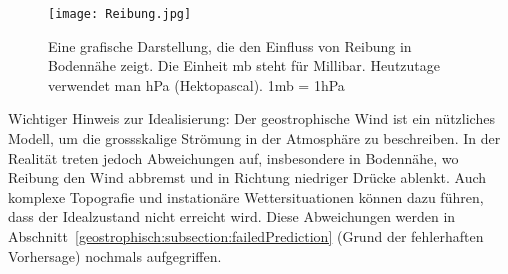 \begin{figure}
    	\centering
    	\texttt{[image: Reibung.jpg]}
  	 \caption{Eine grafische Darstellung, die den Einfluss von Reibung in Bodennähe zeigt. Die Einheit mb steht für Millibar. Heutzutage verwendet man hPa (Hektopascal). 1mb = 1hPa}
   	\label{bild:reibung}
\end{figure}


Wichtiger Hinweis zur Idealisierung:
Der geostrophische Wind ist ein nützliches Modell, um die grossskalige Strömung in der Atmosphäre zu beschreiben. In der Realität treten jedoch Abweichungen auf, insbesondere in Bodennähe, wo Reibung den Wind abbremst und in Richtung niedriger Drücke ablenkt. Auch komplexe Topografie und instationäre Wettersituationen können dazu führen, dass der Idealzustand nicht erreicht wird.
Diese Abweichungen werden in Abschnitt~\ref{geostrophisch:subsection:failedPrediction} (Grund der fehlerhaften Vorhersage) nochmals aufgegriffen.







